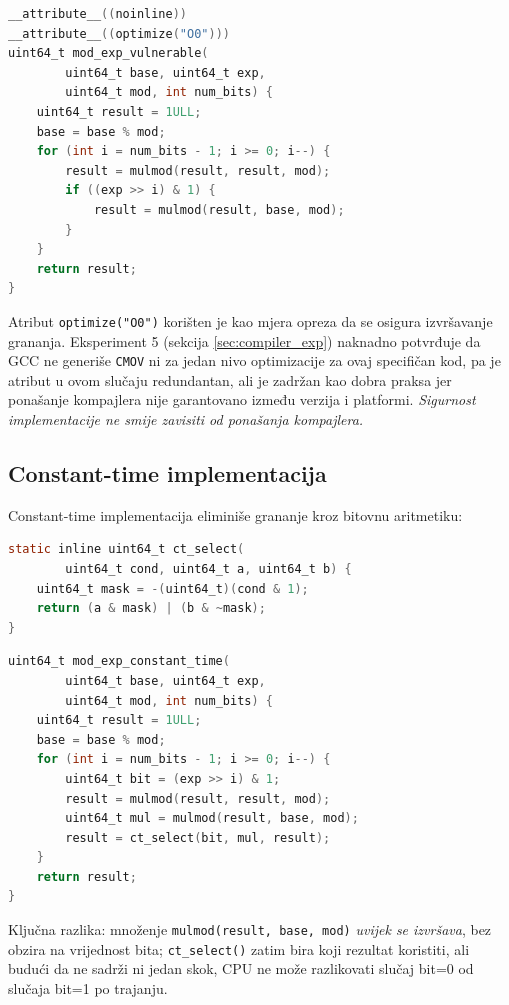 \begin{lstlisting}[language=C, caption={Ranjiva square-and-multiply implementacija}, label=lst:vulnerable]
__attribute__((noinline))
__attribute__((optimize("O0")))
uint64_t mod_exp_vulnerable(
        uint64_t base, uint64_t exp,
        uint64_t mod, int num_bits) {
    uint64_t result = 1ULL;
    base = base % mod;
    for (int i = num_bits - 1; i >= 0; i--) {
        result = mulmod(result, result, mod); 
        if ((exp >> i) & 1) {
            result = mulmod(result, base, mod);
        }
    }
    return result;
}
\end{lstlisting}

Atribut \texttt{optimize("O0")} korišten je kao mjera opreza da se osigura izvršavanje grananja. Eksperiment 5 (sekcija \ref{sec:compiler_exp}) naknadno potvrđuje da GCC ne generiše \texttt{CMOV} ni za jedan nivo optimizacije za ovaj specifičan kod, pa je atribut u ovom slučaju redundantan, ali je zadržan kao dobra praksa jer ponašanje kompajlera nije garantovano između verzija i platformi. \textit{Sigurnost implementacije ne smije zavisiti od ponašanja kompajlera.}

\subsection{Constant-time implementacija}
\label{sec:ct_impl}

Constant-time implementacija eliminiše grananje kroz bitovnu aritmetiku:

\begin{lstlisting}[language=C, caption={Constant-time selekcija bez grananja}]
static inline uint64_t ct_select(
        uint64_t cond, uint64_t a, uint64_t b) {
    uint64_t mask = -(uint64_t)(cond & 1);
    return (a & mask) | (b & ~mask);
}
\end{lstlisting}

\begin{lstlisting}[language=C, caption={Constant-time square-and-multiply}, label=lst:ct]
uint64_t mod_exp_constant_time(
        uint64_t base, uint64_t exp,
        uint64_t mod, int num_bits) {
    uint64_t result = 1ULL;
    base = base % mod;
    for (int i = num_bits - 1; i >= 0; i--) {
        uint64_t bit = (exp >> i) & 1;
        result = mulmod(result, result, mod);  
        uint64_t mul = mulmod(result, base, mod); 
        result = ct_select(bit, mul, result);
    }
    return result;
}
\end{lstlisting}

Ključna razlika: množenje \texttt{mulmod(result, base, mod)} \textit{uvijek se izvršava}, bez obzira na vrijednost bita; \texttt{ct\_select()} zatim bira koji rezultat koristiti, ali budući da ne sadrži ni jedan skok, CPU ne može razlikovati slučaj bit=0 od slučaja bit=1 po trajanju.

